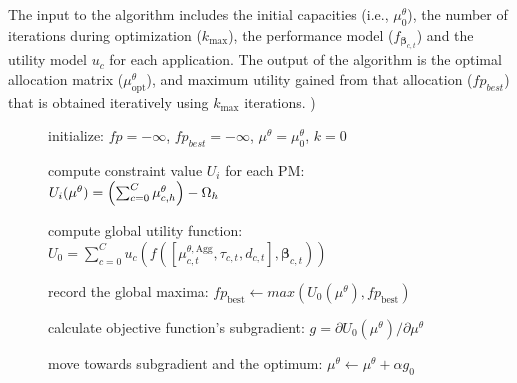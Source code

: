The input to the algorithm includes the initial capacities (i.e., $\mu^\theta_0$), the number of iterations during optimization ($k_{\text{max}}$), the performance model ($f_{\boldsymbol\beta_{c,t}}$) and the utility model $u_c$ for each application. 
The output of the algorithm is the optimal allocation matrix ($\mu^\theta_{\text{opt}}$), and maximum utility gained from that allocation ($fp_{best}$) that is obtained iteratively using $k_{\text{max}}$ iterations. )
 \begin{figure} 
\begin{algorithm}[H]  
	\small
	\SetAlgoVlined
  \SetAlFnt{\tiny}
\footnotesize{}

initialize: $fp=-\infty$, $fp_{best} =-\infty$, $\mu^\theta=\mu^\theta_0$, $k=0$

{
	compute constraint value $U_i$ for each PM:
	$U_i(\mu^\theta)=\left(\sum_{c=0}^{C}{\mu^\theta_{c,h}}\right)-\Omega_h $

	{
		compute global utility function:
		$U_0 = \sum_{c=0}^{C}  u_c(f(\left[\mu^{\theta,\text{Agg}}_{c,t},\tau_{c,t},d_{c,t}\right],\boldsymbol\beta_{c,t})) $

		record the global maxima: %
		$fp_{\text{best}} \gets max(U_0(\mu^\theta), fp_{\text{best}})$ 

		calculate objective function's subgradient:%
			$g=\partial U_0(\mu^\theta) / \partial \mu^\theta $

		move towards subgradient and the optimum: %
		$  \mu^\theta \gets \mu^\theta + \alpha g_0$
	}
	}
\end{algorithm}
\end{figure}
